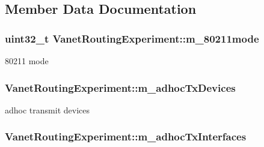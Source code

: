 \subsection{Member Data Documentation}
\subsubsection[{\texorpdfstring{m\+\_\+80211mode}{m_80211mode}}]{\setlength{\rightskip}{0pt plus 5cm}uint32\+\_\+t Vanet\+Routing\+Experiment\+::m\+\_\+80211mode\hspace{0.3cm}{\ttfamily [private]}}\hypertarget{classVanetRoutingExperiment_aae21b34a7fb447a2d7d5bcbcbe8e5fae}{}\label{classVanetRoutingExperiment_aae21b34a7fb447a2d7d5bcbcbe8e5fae}


80211 mode 

\subsubsection[{\texorpdfstring{m\+\_\+adhoc\+Tx\+Devices}{m_adhocTxDevices}}]{ Vanet\+Routing\+Experiment\+::m\+\_\+adhoc\+Tx\+Devices\hspace{0.3cm}{\ttfamily [private]}}\hypertarget{classVanetRoutingExperiment_a613934ac9ec78c32456236ea6f09aa43}{}\label{classVanetRoutingExperiment_a613934ac9ec78c32456236ea6f09aa43}


adhoc transmit devices 

\subsubsection[{\texorpdfstring{m\+\_\+adhoc\+Tx\+Interfaces}{m_adhocTxInterfaces}}]{ Vanet\+Routing\+Experiment\+::m\+\_\+adhoc\+Tx\+Interfaces\hspace{0.3cm}{\ttfamily [private]}}\hypertarget{classVanetRoutingExperiment_ae87cd0d7f20b0cd7dda83d187938ffd0}{}\label{classVanetRoutingExperiment_ae87cd0d7f20b0cd7dda83d187938ffd0}


